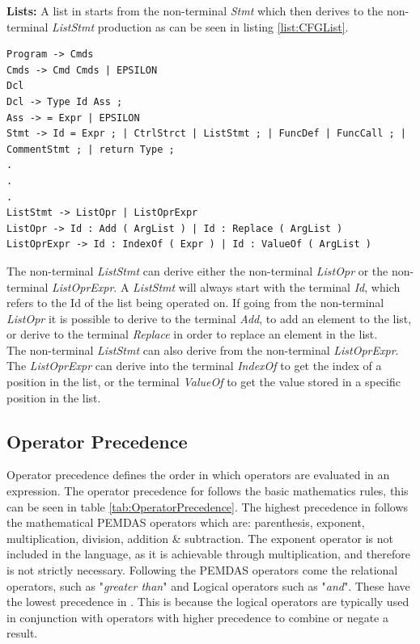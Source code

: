 \textbf{Lists:} A list in \lang starts from the non-terminal \textit{Stmt} which then derives to the non-terminal \textit{ListStmt} production as can be seen in listing \ref{list:CFGList}.
\begin{lstlisting}[language=scriptkid, label={list:CFGList},caption=Lists in \lang CFG]
Program -> Cmds   
Cmds -> Cmd Cmds | EPSILON   
Dcl   
Dcl -> Type Id Ass ;   
Ass -> = Expr | EPSILON   
Stmt -> Id = Expr ; | CtrlStrct | ListStmt ; | FuncDef | FuncCall ; | CommentStmt ; | return Type ; 
.
.
.
ListStmt -> ListOpr | ListOprExpr 
ListOpr -> Id : Add ( ArgList ) | Id : Replace ( ArgList ) 
ListOprExpr -> Id : IndexOf ( Expr ) | Id : ValueOf ( ArgList ) 
\end{lstlisting}
The non-terminal \textit{ListStmt} can derive either the non-terminal \textit{ListOpr} or the non-terminal \textit{ListOprExpr}. A \textit{ListStmt} will always start with the terminal \textit{Id}, which refers to the Id of the list being operated on. If going from the non-terminal \textit{ListOpr} it is possible to derive to the terminal \textit{Add}, to add an element to the list, or derive to the terminal \textit{Replace} in order to replace an element in the list.\\
The non-terminal \textit{ListStmt} can also derive from the non-terminal \textit{ListOprExpr}. The \textit{ListOprExpr} can derive into the terminal \textit{IndexOf} to get the index of a position in the list, or the terminal \textit{ValueOf} to get the value stored in a specific position in the list.


\subsection{Operator Precedence} \label{OrderPrec}
Operator precedence defines the order in which operators are evaluated in an expression. The operator precedence for \lang follows the basic mathematics rules, this can be seen in table \ref{tab:OperatorPrecedence}. The highest precedence in \lang follows the mathematical PEMDAS operators which are: parenthesis, exponent, multiplication, division, addition \& subtraction\cite{mathnasium}. The exponent operator is not included in the language, as it is achievable through multiplication, and therefore is not strictly necessary. Following the PEMDAS operators come the relational operators, such as "\textit{greater than}" and Logical operators such as "\textit{and}". These have the lowest precedence in \lang. This is because the logical operators are typically used in conjunction with operators with higher precedence to combine or negate a result.


